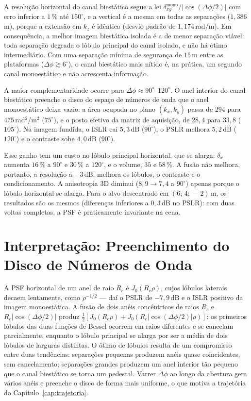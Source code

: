 \documentclass[12pt,a4paper,oneside]{book}
\theoremstyle{remark}
\newcommand{\dB}{\,\mathrm{dB}}
\theoremstyle{plain}
\theoremstyle{definition}
\begin{document}
A resolução horizontal do canal biestático segue a lei
$\delta_{xy}^{\text{mono}}/|\cos(\Delta\phi/2)|$ com erro inferior a $1\,\%$ até
$150^\circ$, e a vertical é a mesma em todas as separações ($1,386\,$m), porque a
extensão em $k_z$ é idêntica (desvio padrão de $1,174\,$rad/m). Em consequência, a
melhor imagem biestática isolada é a de menor separação viável: toda separação
degrada o lóbulo principal do canal isolado, e não há ótimo intermediário. Com uma
separação mínima de segurança de $15\,$m entre as plataformas
($\Delta\phi\gtrsim6^\circ$), o canal biestático mais nítido é, na prática, um
segundo canal monoestático e não acrescenta informação.

A maior complementaridade ocorre para $\Delta\phi\approx90^\circ$--$120^\circ$. O
anel interior do canal biestático preenche o disco do espaço de números de onda que
o anel monoestático deixa vazio: a área ocupada no plano $(k_x,k_y)$ passa de $294$
para $475\,$rad$^2$/m$^2$ ($75^\circ$), e o posto efetivo da matriz de aquisição, de
$28,4$ para $33,8$ ($105^\circ$). Na imagem fundida, o ISLR cai $5,3\dB$
($90^\circ$), o PSLR melhora $5,2\dB$ ($120^\circ$) e o contraste sobe $4,0\dB$
($90^\circ$).

Esse ganho tem um custo no lóbulo principal horizontal, que se alarga: $\delta_x$
aumenta $16\,\%$ a $90^\circ$ e $30\,\%$ a $120^\circ$, e o volume, $35$ e $58\,\%$. A
fusão não melhora, portanto, a resolução a $-3\dB$; melhora os lóbulos, o contraste
e o condicionamento. A anisotropia 3D diminui ($8,9\to7,4$ a $90^\circ$) apenas
porque o lóbulo horizontal se alarga. Para o alvo descentrado em
$(6;\,4;\,-2)\,$m, os resultados são os mesmos (diferenças inferiores a $0,3\dB$
no PSLR): com duas voltas completas, a PSF é praticamente invariante na cena.

\section{Interpretação: Preenchimento do Disco de Números de Onda}
\label{sec:geo_interp}

A PSF horizontal de um anel de raio $R_c$ é $J_0(R_c\rho)$, cujos lóbulos
laterais decaem lentamente, como $\rho^{-1/2}$ --- daí o PSLR de $-7,9\dB$ e o
ISLR positivo da imagem monoestática. A fusão de dois anéis concêntricos de
raios $R_c$ e $R_c|\cos(\Delta\phi/2)|$ produz
$\tfrac12[J_0(R_c\rho)+J_0(R_c|\cos(\Delta\phi/2)|\rho)]$: os primeiros lóbulos
das duas funções de Bessel ocorrem em raios diferentes e se cancelam
parcialmente, enquanto o lóbulo principal se alarga por ser a média de dois
lóbulos de larguras distintas. O ótimo de lóbulos resulta de um compromisso
entre duas tendências: separações pequenas produzem anéis quase coincidentes,
sem cancelamento; separações grandes produzem um anel interior tão pequeno que
o canal biestático se torna um pedestal. Varrer $\Delta\phi$ ao longo da
abertura gera vários anéis e preenche o disco de forma mais uniforme, o que
motiva a trajetória do Capítulo~\ref{cap:trajetoria}.
\end{document}
